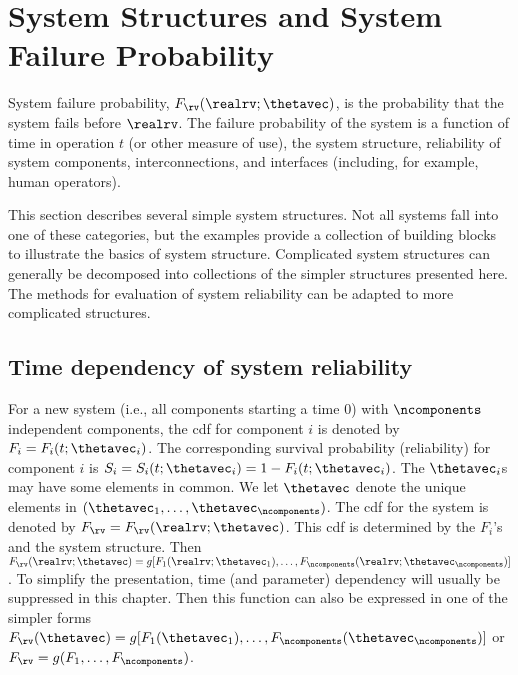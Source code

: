 \section{System Structures and System Failure Probability}
\label{section:system.structure}
System failure probability, $F_{\rv}(\realrv; \thetavec)$, is 
the probability that the system fails before $\realrv$.
The failure probability of the system is a function of time in
operation $t$ (or other measure of use), the system structure,
reliability of system components, interconnections, and interfaces
(including, for example, human operators).

This section describes several simple system structures. Not all
systems fall into one of these categories, but the examples provide
a collection of building blocks to illustrate the basics of system
structure. Complicated system structures can generally be decomposed
into collections of the simpler structures presented here. The
methods for evaluation of system reliability can be adapted to more
complicated structures.

\subsection{Time dependency of system reliability}
\label{F.as.fun.of.time}
For a new system (i.e., all components starting
a time 0) with $\ncomponents$ independent components, the cdf for
component $i$ is denoted by $F_{i}=F_{i}(t;\thetavec_{i})$. The
corresponding survival probability (reliability) for component $i$ is
$S_{i}=S_{i}(t;\thetavec_{i})= 1-F_{i}(t;\thetavec_{i})$.  The
$\thetavec_{i}$s may have some elements in common. We let $\thetavec$
denote the unique elements in
$(\thetavec_{1},\ldots,\thetavec_{\ncomponents})$.  The cdf for the
system is denoted by $F_{\rv}=F_{\rv}(\realrv ; \thetavec)$.  This cdf
is determined by the $F_{i}$'s and the system structure.  Then
$F_{\rv}(\realrv; \thetavec)=g[F_{1}(\realrv; \thetavec_{1}),
\ldots,F_{\ncomponents}(\realrv; \thetavec_{\ncomponents})]$.
To simplify the presentation, time (and parameter) dependency will
usually be suppressed in this chapter.  Then this function can also be
expressed in one of the simpler forms $F_{\rv}( \thetavec)=g[F_{1}(
\thetavec_{1}),
\ldots,F_{\ncomponents}(\thetavec_{\ncomponents})]$ or
$F_{\rv}=g(F_{1}, \ldots,F_{\ncomponents})$.  

